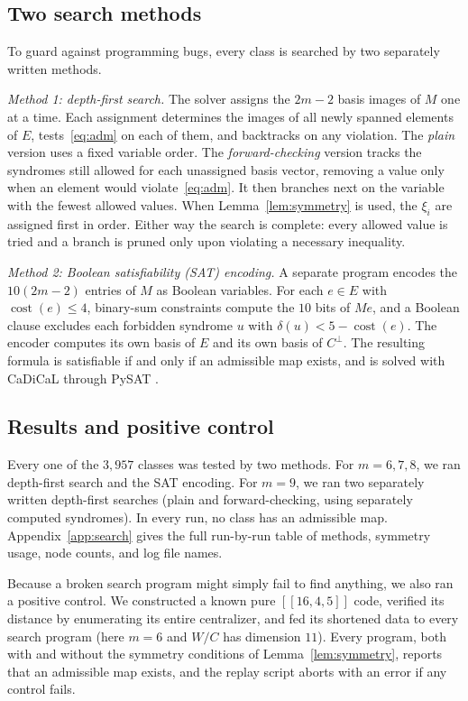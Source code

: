 \documentclass[11pt]{article}
\theoremstyle{definition}
\theoremstyle{remark}
\newcommand{\qc}[1]{[\![#1]\!]}
\newcommand{\cost}{\operatorname{cost}}
\begin{document}
\subsection{Two search methods}

To guard against programming bugs, every class is searched by two
separately written methods.

\emph{Method 1: depth-first search.} The solver assigns the \(2m-2\)
basis images of \(M\) one at a time. Each assignment determines the
images of all newly spanned elements of \(E\), tests~\eqref{eq:adm} on
each of them, and backtracks on any violation. The \emph{plain} version
uses a fixed variable order. The \emph{forward-checking} version tracks
the syndromes still allowed for each unassigned basis vector, removing a
value only when an element would violate~\eqref{eq:adm}. It then
branches next on the variable with the fewest allowed values. When
Lemma~\ref{lem:symmetry} is used, the \(\xi_i\) are assigned first in
order. Either way the search is complete: every allowed value is tried
and a branch is pruned only upon violating a necessary inequality.

\emph{Method 2: Boolean satisfiability (SAT) encoding.} A separate
program encodes the \(10(2m-2)\) entries of \(M\) as Boolean variables.
For each \(e\in E\) with \(\cost(e)\leq4\), binary-sum constraints
compute the \(10\) bits of \(Me\), and a Boolean clause excludes each
forbidden syndrome \(u\) with \(\delta(u)<5-\cost(e)\). The encoder
computes its own basis of \(E\) and its own basis of \(C^\perp\). The
resulting formula is satisfiable if and only if an admissible map
exists, and is solved with CaDiCaL \cite{cadical} through PySAT
\cite{pysat}.

\subsection{Results and positive control}

Every one of the \(3{,}957\) classes was tested by two methods. For
\(m=6,7,8\), we ran depth-first search and the SAT encoding. For
\(m=9\), we ran two separately written depth-first searches (plain and
forward-checking, using separately computed syndromes). In every run, no
class has an admissible map. Appendix~\ref{app:search} gives the full
run-by-run table of methods, symmetry usage, node counts, and log file
names.

Because a broken search program might simply fail to find anything, we
also ran a positive control. We constructed a known pure \(\qc{16,4,5}\)
code, verified its distance by enumerating its entire centralizer, and
fed its shortened data to every search program (here \(m=6\) and \(W/C\)
has dimension \(11\)). Every program, both with and without the symmetry
conditions of Lemma~\ref{lem:symmetry}, reports that an admissible map
exists, and the replay script aborts with an error if any control fails.
\end{document}
